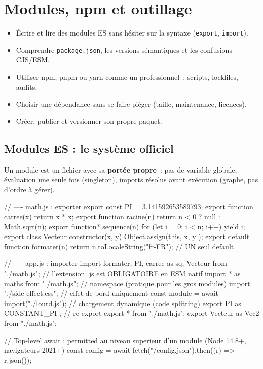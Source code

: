 \chapter{Modules, npm et outillage}
\label{ch-js-modules}

\begin{objectif}
\begin{itemize}
  \item \'Ecrire et lire des modules ES sans h\'esiter sur la syntaxe (\texttt{export}, \texttt{import}).
  \item Comprendre \texttt{package.json}, les versions s\'emantiques et les confusions CJS/ESM.
  \item Utiliser npm, pnpm ou yarn comme un professionnel~: scripts, lockfiles, audits.
  \item Choisir une d\'ependance sans se faire pi\'eger (taille, maintenance, licences).
  \item Cr\'eer, publier et versionner son propre paquet.
\end{itemize}
\end{objectif}

\section{Modules ES : le syst\`eme officiel}

Un module est un fichier avec sa \textbf{port\'ee propre}~: pas de variable globale, \'evaluation
une seule fois (singleton), imports r\'esolus avant ex\'ecution (graphe, pas d'ordre \`a g\'erer).

\begin{codejs}
// ---- math.js : exporter
export const PI = 3.141592653589793;
export function carree(x) { return x * x; }
export function racine(n) { return n < 0 ? null : Math.sqrt(n); }
export function* sequence(n) { for (let i = 0; i < n; i++) yield i; }
export class Vecteur { constructor(x, y) { Object.assign(this, { x, y }); } }
export default function formater(n) { return n.toLocaleString("fr-FR"); }   // UN seul default

// ---- app.js : importer
import formater, { PI, carree as sq, Vecteur } from "./math.js";      // l'extension .js est OBLIGATOIRE en ESM natif
import * as maths from "./math.js";                                    // namespace (pratique pour les gros modules)
import "./side-effect.css";                                            // effet de bord uniquement
const module = await import("./lourd.js");                             // chargement dynamique (code splitting)
export { PI as CONSTANT_PI };                                          // re-export
export * from "./math.js";
export { Vecteur as Vec2 } from "./math.js";

// Top-level await : permitted au niveau superieur d'un module (Node 14.8+, navigateurs 2021+)
const config = await fetch("/config.json").then((r) => r.json());
\end{codejs}

